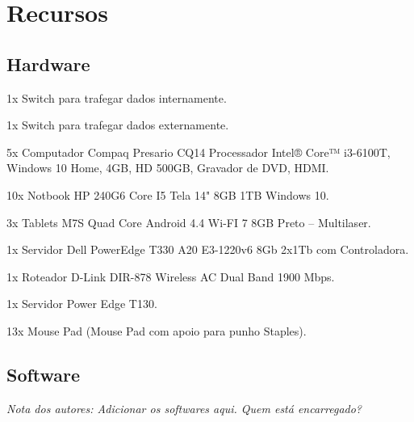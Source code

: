 \chapter[Recursos]{Recursos}

\section[Hardware]{Hardware}

\begin{alineas}
    \item 1x Switch para trafegar dados internamente.
    \item 1x Switch para trafegar dados externamente.
    \item 5x Computador Compaq Presario CQ14 Processador Intel® Core™ i3-6100T, Windows 10 Home, 4GB, HD 500GB, Gravador de DVD, HDMI.
    \item 10x Notbook HP 240G6 Core I5 Tela 14" 8GB 1TB Windows 10.
    \item 3x Tablets M7S Quad Core Android 4.4 Wi-FI 7 8GB Preto – Multilaser.
    \item 1x Servidor Dell PowerEdge T330 A20 E3-1220v6 8Gb 2x1Tb com Controladora.
    \item 1x Roteador D-Link DIR-878 Wireless AC Dual Band 1900 Mbps.
    \item 1x Servidor Power Edge T130.
    \item 13x Mouse Pad (Mouse Pad com apoio para punho Staples).
\end{alineas}

\section[Software]{Software}

\textit{Nota dos autores: Adicionar os softwares aqui. Quem está encarregado?}

